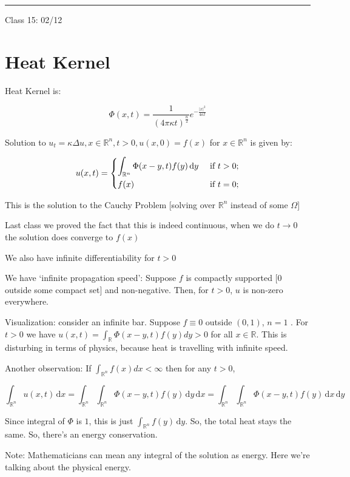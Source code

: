 \documentclass{article}
\theoremstyle{definition}
\begin{document}
\hfil
\hrule

Class 15: 02/12

\section*{Heat Kernel}

Heat Kernel is:

\[
    \Phi(x,t) = \frac{1}{(4\pi \kappa t)^\frac{n}{2}}e^{-\frac{\vert x \vert ^2}{4 \kappa t}}
\]

Solution to \(u_t = \kappa \Delta u, x\in\mathbb{R}^n,t > 0, u(x,0)=f(x)\) for \(x\in\mathbb{R}^n\) is given by:

\[
    u(x,t) = \begin{dcases}
        \int_{\mathbb{R}^n}^{} \Phi(x-y,t)f(y) \,\mathrm{d}y  &\text{ if } t > 0 ;\\
        f(x) &\text{ if } t = 0 ;
    \end{dcases}
\]

This is the solution to the Cauchy Problem [solving over \(\mathbb{R}^n\) instead of some \(\Omega\)]

Last class we proved the fact that this is indeed continuous, when we do \(t \to 0\) the solution does converge to \(f(x)\) 

We also have infinite differentiability for \(t > 0\) 

We have `infinite propagation speed': Suppose \(f\) is compactly supported [0 outside some compact set] and non-negative. Then, for \(t > 0\), \(u\) is non-zero everywhere.

Visualization: consider an infinite bar. Suppose \(f\equiv 0\) outside \((0,1)\), \(n=1\) . For \(t > 0\) we have \(u(x,t)=\int_\mathbb{R} \Phi(x-y,t)f(y)dy > 0\) for all \(x\in\mathbb{R}\). This is disturbing in terms of physics, because heat is travelling with infinite speed.

Another observation: If \(\int_{\mathbb{R}^n} f(x)dx < \infty\) then for any \(t > 0\),

\[
    \int_{\mathbb{R}^n}^{} u(x,t) \,\mathrm{d}x = \int_{\mathbb{R}^n}^{} \int_{\mathbb{R}^n}^{} \Phi(x-y,t)f(y) \,\mathrm{d}y  \,\mathrm{d}x = \int_{\mathbb{R}^n}^{} \int_{\mathbb{R}^n}^{} \Phi(x-y,t)f(y) \,\mathrm{d}x  \,\mathrm{d}y 
\]

Since integral of \(\Phi\) is \(1\), this is just \(\int_{\mathbb{R}^n}^{} f(y) \,\mathrm{d}y \). So, the total heat stays the same. So, there's an energy conservation.

Note: Mathematicians can mean any integral of the solution as energy. Here we're talking about the physical energy.
\end{document}
